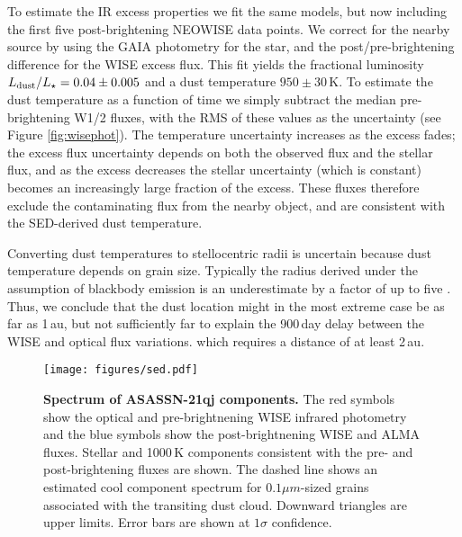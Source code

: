 \documentclass[sn-nature,oneside]{sn-jnl}%
\begin{document}
To estimate the IR excess properties we fit the same models, but now including the first five post-brightening NEOWISE data points.
%
We correct for the nearby source by using the GAIA photometry for the star, and the post/pre-brightening difference for the WISE excess flux.
%
This fit yields the fractional luminosity $L_{\rm dust}/L_\star = 0.04 \pm 0.005$ and a dust temperature $950 \pm 30$\,K.
%
To estimate the dust temperature as a function of time we simply subtract the median pre-brightening W1/2 fluxes, with the RMS of these values as the uncertainty (see Figure \ref{fig:wisephot}).
%
The temperature uncertainty increases as the excess fades; the excess flux uncertainty depends on both the observed flux and the stellar flux, and as the excess decreases the stellar uncertainty (which is constant) becomes an increasingly large fraction of the excess.
%
These fluxes therefore exclude the contaminating flux from the nearby object, and are consistent with the SED-derived dust temperature.

Converting dust temperatures to stellocentric radii is uncertain because dust temperature depends on grain size.
%
Typically the radius derived under the assumption of blackbody emission is an underestimate by a factor of up to five \citep{2013MNRAS.428.1263B,2015MNRAS.454.3207P}.
%
Thus, we conclude that the dust location might in the most extreme case be as far as 1\,au, but not sufficiently far to explain the 900\,day delay between the WISE and optical flux variations. which requires a distance of at least 2\,au.

\begin{figure}[h!]
    \centering
\texttt{[image: figures/sed.pdf]}
    \caption{\textbf{Spectrum of ASASSN-21qj components.}
    The red symbols show the optical and pre-brightnening WISE infrared photometry and the blue symbols show the post-brightnening WISE and ALMA fluxes.
    Stellar and 1000\,K components consistent with the pre- and post-brightening fluxes are shown.
    The dashed line shows an estimated cool component spectrum for $0.1\mu m$-sized grains associated with the transiting dust cloud.
    Downward triangles are upper limits.
    Error bars are shown at $1\sigma$ confidence.
}
       \label{fig:sed}

\end{figure}
%
\end{document}
